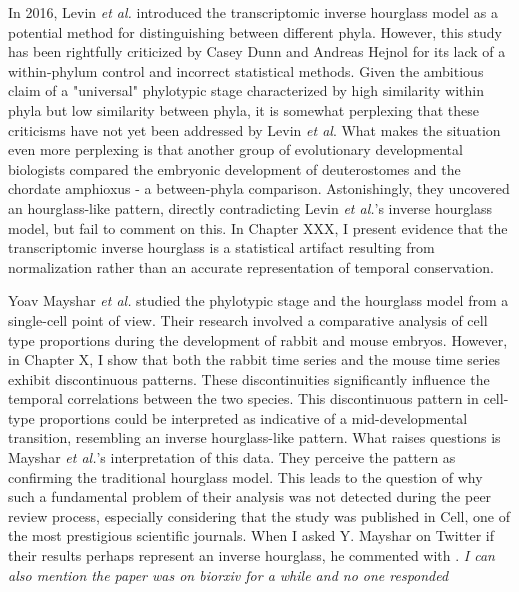 In 2016, Levin \textit{et al.} introduced the transcriptomic inverse hourglass model as a potential method for distinguishing between different phyla\cite{Levin2016}. However, this study has been rightfully criticized by Casey Dunn and Andreas Hejnol for its lack of a within-phylum control\cite{hejnol2016} and incorrect statistical methods\cite{Dunn2018}. Given the ambitious claim of a "universal" phylotypic stage characterized by high similarity within phyla but low similarity between phyla, it is somewhat perplexing that these criticisms have not yet been addressed by Levin \textit{et al}. What makes the situation even more perplexing is that another group of evolutionary developmental biologists compared the embryonic development of deuterostomes and the chordate amphioxus - a between-phyla comparison. Astonishingly, they uncovered an hourglass-like pattern\cite{PerezPosada2022}, directly contradicting Levin \textit{et al.}'s inverse hourglass model, but fail to comment on this. In Chapter XXX, I present evidence that the transcriptomic inverse hourglass is a statistical artifact resulting from normalization rather than an accurate representation of temporal conservation. 

Yoav Mayshar \textit{et al.} studied the phylotypic stage and the hourglass model from a single-cell point of view\cite{Mayshar2023}. Their research involved a comparative analysis of cell type proportions during the development of rabbit and mouse embryos. However, in Chapter X, I show that both the rabbit time series and the mouse time series exhibit discontinuous patterns. These discontinuities significantly influence the temporal correlations between the two species. This discontinuous pattern in cell-type proportions could be interpreted as indicative of a mid-developmental transition, resembling an inverse hourglass-like pattern. What raises questions is Mayshar \textit{et al.}'s interpretation of this data. They perceive the pattern as confirming the traditional hourglass model. This leads to the question of why such a fundamental problem of their analysis was not detected during the peer review process, especially considering that the study was published in Cell, one of the most prestigious scientific journals. When I asked Y. Mayshar on Twitter if their results perhaps represent an inverse hourglass, he commented with . 
\textit{I can also mention the paper was on biorxiv for a while and no one responded}

